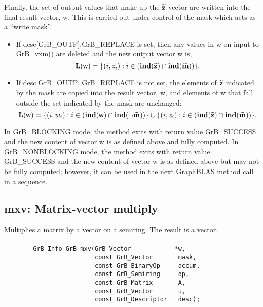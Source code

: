 Finally, the set of output values that make up the ${\bf \widetilde{z}}$ 
vector are written into the final result vector, {\sf w}. 
This is carried out under control of the mask which acts as a ``write mask''.
\begin{itemize}
\item If {\sf desc[GrB\_OUTP].GrB\_REPLACE} is set, then any values in {\sf w} 
on input to {\sf GrB\_vxm()} are deleted and the new output vector {\sf w} is,
\[ 
\bold{L}({\sf w}) = \{(i,z_{i}) : i \in (\bold{ind}({\bf \widetilde{z}}) 
\cap \bold{ind}({\bf \widetilde{m}})) \}. 
\]

\item If {\sf desc[GrB\_OUTP].GrB\_REPLACE} is not set, the elements of 
${\bf \widetilde{z}}$ indicated by the mask are copied into the result 
vector, {\sf w}, and elements of {\sf w} that fall outside the set indicated by 
the mask are unchanged:
\[ 
\bold{L}({\sf w}) = \{(i,w_{i}) : i \in (\bold{ind}({\bf \sf w}) 
\cap \bold{ind}(\neg {\bf \widetilde{m}})) \} \cup \{(i,z_{i}) : i \in 
(\bold{ind}({\bf \widetilde{z}}) \cap \bold{ind}({\bf \widetilde{m}})) \}. 
\]
\end{itemize}

In {\sf GrB\_BLOCKING} mode, the method exits with return value 
{\sf GrB\_SUCCESS} and the new content of vector {\sf w} is as defined above
and fully computed.  
In {\sf GrB\_NONBLOCKING} mode, the method exits with return value 
{\sf GrB\_SUCCESS} and the new content of vector {\sf w} is as defined above 
but may not be fully computed; however, it can be used in the next GraphBLAS 
method call in a sequence.



\subsection{{\sf mxv}: Matrix-vector multiply}

Multiplies a matrix by a vector on a semiring. The result is a vector.

\paragraph{\syntax}

\begin{verbatim}
        GrB_Info GrB_mxv(GrB_Vector            *w,
                         const GrB_Vector       mask,
                         const GrB_BinaryOp     accum,
                         const GrB_Semiring     op, 
                         const GrB_Matrix       A,
                         const GrB_Vector       u,
                         const GrB_Descriptor   desc);
\end{verbatim}


